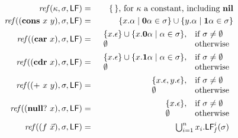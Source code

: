 \documentclass[9pt]{sigplanconf}
\def\myvec{\mathaccent"017E } %
\begin{document}
\begin{figure*}[t]
\begin{eqnarray*}
\mathit{ref\/}(\kappa,\sigma,\Lfonly)
          &=& \{\,\} \mbox{, for $\kappa$ a constant, including
$\NIL$}\\
\mathit{ref\/}((\CONS~x~y),\sigma,\Lfonly)
          &=& \{x.\alpha \mid \acar\alpha \in \sigma\} \cup \{y.\alpha
\mid \acdr\alpha \in \sigma\} \\
\mathit{ref\/}((\CAR~x),\sigma,\Lfonly)
          &=&    \begin{array}{l l}
                    \{x.\epsilon\} \cup \{x.\acar\alpha \mid \alpha \in
\sigma\}, & \mbox{if}~\sigma \ne \emptyset\\
                    \emptyset  & \mbox{otherwise}
                 \end{array} \\
\mathit{ref\/}((\CDR~x),\sigma,\Lfonly)
          &=&    \begin{array}{l l}
                    \{x.\epsilon\} \cup \{x.\acdr\alpha \mid \alpha \in
\sigma\}, & \mbox{if}~\sigma \ne \emptyset\\
                    \emptyset  & \mbox{otherwise}
                 \end{array} \\
\mathit{ref\/}((\PRIM~x~y),\sigma,\Lfonly)
          &=&    \begin{array}{l l}
                    \{x.\epsilon, y.\epsilon\},  & \mbox{if}~\sigma \ne
\emptyset\\
                    \emptyset  & \mbox{otherwise}
                 \end{array} \\
\mathit{ref\/}((\NULLQ~x),\sigma,\Lfonly)
          &=&    \begin{array}{l l}
                    \{x.\epsilon\},  & \mbox{if}~\sigma \ne \emptyset\\
                    \emptyset  & \mbox{otherwise}
                 \end{array} \\
\mathit{ref\/}((f~\myvec{x}),\sigma,\Lfonly)
          &=&  \begin{array}{@{}l}  %
               \bigcup_{i=1}^n x_i.\Lf{f}{i}{\sigma}
               \end{array}
\\[1ex]

\end{eqnarray*}
\end{figure*}
\end{document}
